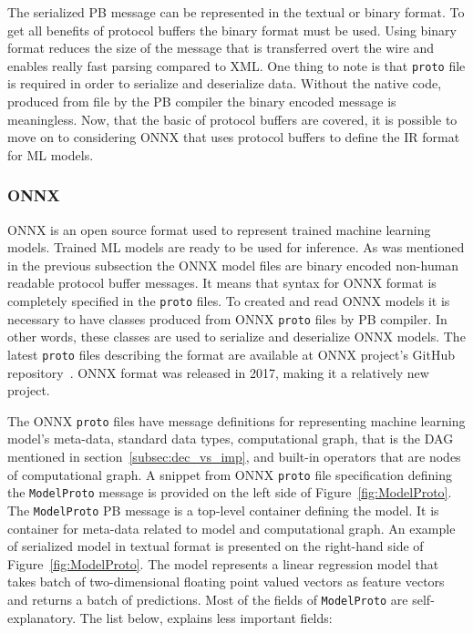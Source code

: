 \documentclass[english, 12pt, a4paper, elec, utf8, online]{aaltothesis}
\begin{document}
The serialized PB message can be represented in the textual or binary format. To get all benefits of protocol buffers the binary format must be used. Using binary format reduces the size of the message that is transferred overt the wire and enables really fast parsing compared to XML. One thing to note is that \texttt{proto} file is required in order to serialize and deserialize data. Without the native code, produced from  file by the PB compiler the binary encoded message is meaningless.  Now, that the basic of protocol buffers are covered, it is possible to  move on to considering ONNX that uses protocol buffers to define the IR format for ML models. 

\subsubsection{ONNX}
ONNX is an open source format used to represent trained machine learning models. Trained ML models are ready to be used for inference. As was mentioned in the previous subsection the ONNX model files are binary encoded non-human readable protocol buffer messages. It means that syntax for ONNX format is completely specified in the \texttt{proto} files. To created and read ONNX models it is necessary to have classes produced from ONNX \texttt{proto} files by PB compiler. In other words, these classes are used to serialize and deserialize ONNX models. The latest \texttt{proto} files describing the format are available at ONNX project's GitHub repository~\cite{onnx_github}. ONNX format was released in 2017, making it a relatively new project. 

The ONNX \texttt{proto} files have message definitions for representing machine learning model's meta-data, standard data types, computational graph, that is the DAG mentioned in section~\ref{subsec:dec_vs_imp}, and built-in operators that are nodes of computational graph. A snippet from ONNX \texttt{proto} file specification defining the \texttt{ModelProto} message is provided on the left side of Figure~\ref{fig:ModelProto}. The \texttt{ModelProto} PB message is a top-level container defining the model. It is container for meta-data related to model and computational graph. An example of serialized model in textual format is presented on the right-hand side of Figure~\ref{fig:ModelProto}. The model represents a linear regression model that takes batch of two-dimensional floating point valued vectors as feature vectors and returns a batch of predictions. Most of the fields of \texttt{ModelProto} are self-explanatory. The list below, explains less important fields:
\end{document}
